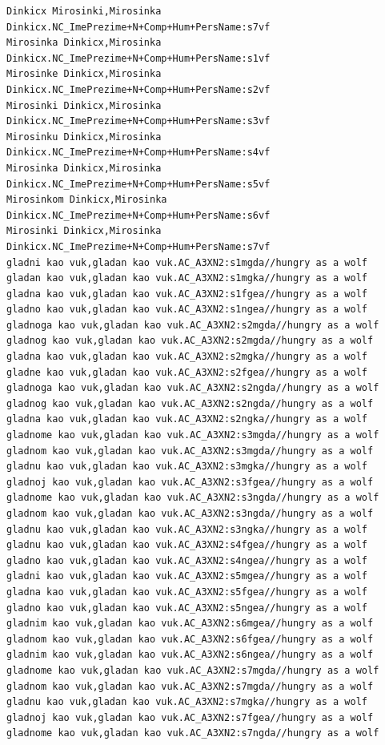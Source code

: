 \begin{verbatim}
Dinkicx Mirosinki,Mirosinka Dinkicx.NC_ImePrezime+N+Comp+Hum+PersName:s7vf
Mirosinka Dinkicx,Mirosinka Dinkicx.NC_ImePrezime+N+Comp+Hum+PersName:s1vf
Mirosinke Dinkicx,Mirosinka Dinkicx.NC_ImePrezime+N+Comp+Hum+PersName:s2vf
Mirosinki Dinkicx,Mirosinka Dinkicx.NC_ImePrezime+N+Comp+Hum+PersName:s3vf
Mirosinku Dinkicx,Mirosinka Dinkicx.NC_ImePrezime+N+Comp+Hum+PersName:s4vf
Mirosinka Dinkicx,Mirosinka Dinkicx.NC_ImePrezime+N+Comp+Hum+PersName:s5vf
Mirosinkom Dinkicx,Mirosinka Dinkicx.NC_ImePrezime+N+Comp+Hum+PersName:s6vf
Mirosinki Dinkicx,Mirosinka Dinkicx.NC_ImePrezime+N+Comp+Hum+PersName:s7vf
gladni kao vuk,gladan kao vuk.AC_A3XN2:s1mgda//hungry as a wolf
gladan kao vuk,gladan kao vuk.AC_A3XN2:s1mgka//hungry as a wolf
gladna kao vuk,gladan kao vuk.AC_A3XN2:s1fgea//hungry as a wolf
gladno kao vuk,gladan kao vuk.AC_A3XN2:s1ngea//hungry as a wolf
gladnoga kao vuk,gladan kao vuk.AC_A3XN2:s2mgda//hungry as a wolf
gladnog kao vuk,gladan kao vuk.AC_A3XN2:s2mgda//hungry as a wolf
gladna kao vuk,gladan kao vuk.AC_A3XN2:s2mgka//hungry as a wolf
gladne kao vuk,gladan kao vuk.AC_A3XN2:s2fgea//hungry as a wolf
gladnoga kao vuk,gladan kao vuk.AC_A3XN2:s2ngda//hungry as a wolf
gladnog kao vuk,gladan kao vuk.AC_A3XN2:s2ngda//hungry as a wolf
gladna kao vuk,gladan kao vuk.AC_A3XN2:s2ngka//hungry as a wolf
gladnome kao vuk,gladan kao vuk.AC_A3XN2:s3mgda//hungry as a wolf
gladnom kao vuk,gladan kao vuk.AC_A3XN2:s3mgda//hungry as a wolf
gladnu kao vuk,gladan kao vuk.AC_A3XN2:s3mgka//hungry as a wolf
gladnoj kao vuk,gladan kao vuk.AC_A3XN2:s3fgea//hungry as a wolf
gladnome kao vuk,gladan kao vuk.AC_A3XN2:s3ngda//hungry as a wolf
gladnom kao vuk,gladan kao vuk.AC_A3XN2:s3ngda//hungry as a wolf
gladnu kao vuk,gladan kao vuk.AC_A3XN2:s3ngka//hungry as a wolf
gladnu kao vuk,gladan kao vuk.AC_A3XN2:s4fgea//hungry as a wolf
gladno kao vuk,gladan kao vuk.AC_A3XN2:s4ngea//hungry as a wolf
gladni kao vuk,gladan kao vuk.AC_A3XN2:s5mgea//hungry as a wolf
gladna kao vuk,gladan kao vuk.AC_A3XN2:s5fgea//hungry as a wolf
gladno kao vuk,gladan kao vuk.AC_A3XN2:s5ngea//hungry as a wolf
gladnim kao vuk,gladan kao vuk.AC_A3XN2:s6mgea//hungry as a wolf
gladnom kao vuk,gladan kao vuk.AC_A3XN2:s6fgea//hungry as a wolf
gladnim kao vuk,gladan kao vuk.AC_A3XN2:s6ngea//hungry as a wolf
gladnome kao vuk,gladan kao vuk.AC_A3XN2:s7mgda//hungry as a wolf
gladnom kao vuk,gladan kao vuk.AC_A3XN2:s7mgda//hungry as a wolf
gladnu kao vuk,gladan kao vuk.AC_A3XN2:s7mgka//hungry as a wolf
gladnoj kao vuk,gladan kao vuk.AC_A3XN2:s7fgea//hungry as a wolf
gladnome kao vuk,gladan kao vuk.AC_A3XN2:s7ngda//hungry as a wolf

\end{verbatim}
